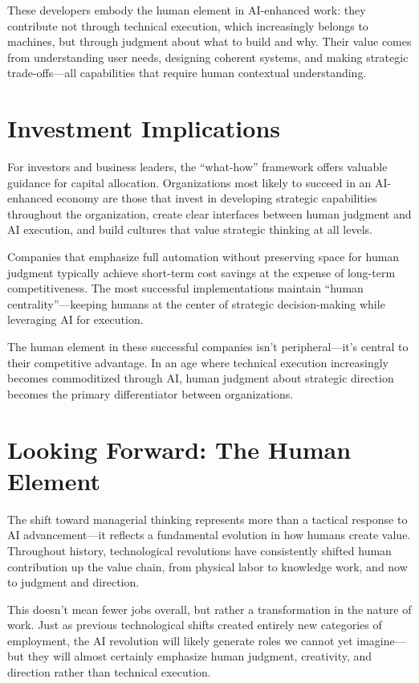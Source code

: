 \documentclass[
  Letterpaper,
]{scrbook}
\begin{document}
These developers embody the human element in AI-enhanced work: they
contribute not through technical execution, which increasingly belongs
to machines, but through judgment about what to build and why. Their
value comes from understanding user needs, designing coherent systems,
and making strategic trade-offs---all capabilities that require human
contextual understanding.

\section{Investment Implications}\label{investment-implications-4}

For investors and business leaders, the ``what-how'' framework offers
valuable guidance for capital allocation. Organizations most likely to
succeed in an AI-enhanced economy are those that invest in developing
strategic capabilities throughout the organization, create clear
interfaces between human judgment and AI execution, and build cultures
that value strategic thinking at all levels.

Companies that emphasize full automation without preserving space for
human judgment typically achieve short-term cost savings at the expense
of long-term competitiveness. The most successful implementations
maintain ``human
centrality''---keeping
humans at the center of strategic decision-making while leveraging AI
for execution.

The human element in these successful companies isn't peripheral---it's
central to their competitive
advantage. In an age where
technical execution increasingly becomes commoditized through AI, human
judgment about strategic direction becomes the primary differentiator
between organizations.

\section{Looking Forward: The Human
Element}\label{looking-forward-the-human-element}

The shift toward managerial thinking represents more than a tactical
response to AI advancement---it reflects a fundamental evolution in how
humans create value. Throughout history, technological revolutions have
consistently shifted human contribution up the value chain, from
physical labor to knowledge work, and now to judgment and direction.

This doesn't mean fewer jobs overall, but rather a transformation in the
nature of work. Just as previous technological shifts created entirely
new categories of employment, the AI revolution will likely generate
roles we cannot yet imagine---but they will almost certainly emphasize
human judgment, creativity, and direction rather than technical
execution.
\end{document}
